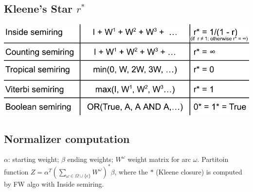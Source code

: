 \subsection*{Kleene's Star $r^{*}$}
\includegraphics[width=\columnwidth]{img/KleeneStar.png}

\subsection*{Normalizer computation}

$\mathbb{\alpha}$: starting weight; $\mathbb{\beta}$ ending weights; $W^{\omega}$ weight matrix for arc $\omega$. Partitoin function $Z = \alpha^T (\sum_{\omega\in \Omega\cup \{\epsilon\}} W^{\omega})^* \beta$, where the $*$ (Kleene closure) is computed by FW algo with Inside semiring.

